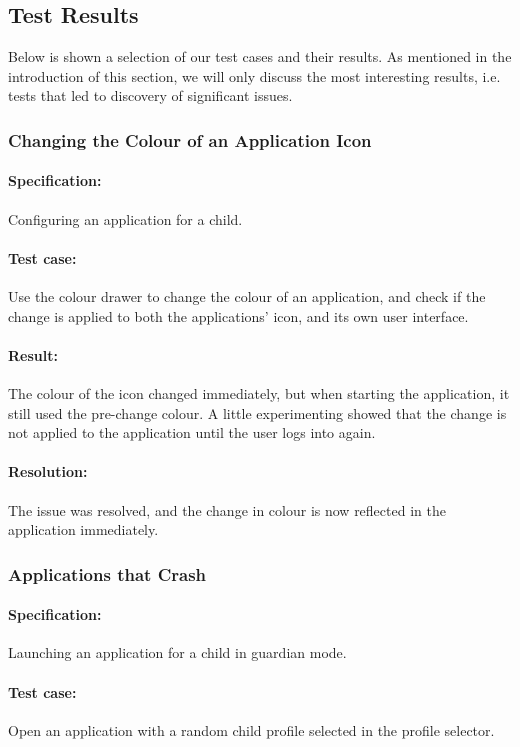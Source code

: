 \subsection{Test Results}\label{sec:sprint1:testing_results}
Below is shown a selection of our test cases and their results.
As mentioned in the introduction of this section, we will only discuss the most interesting results, i.e. tests that led to discovery of significant issues.


\subsubsection*{Changing the Colour of an Application Icon}

\paragraph{Specification:} Configuring an application for a child.
\paragraph{Test case:} Use the colour drawer to change the colour of an application, and check if the change is applied to both the applications' icon, and its own user interface.
\paragraph{Result:} The colour of the icon changed immediately, but when starting the application, it still used the pre-change colour. A little experimenting showed that the change is not applied to the application until the user logs into \launcher again.
\paragraph{Resolution:} The issue was resolved, and the change in colour is now reflected in the application immediately.

\subsubsection*{Applications that Crash \launcher}

\paragraph{Specification:} Launching an application for a child in guardian mode.
\paragraph{Test case:} Open an application with a random child profile selected in the profile selector.
